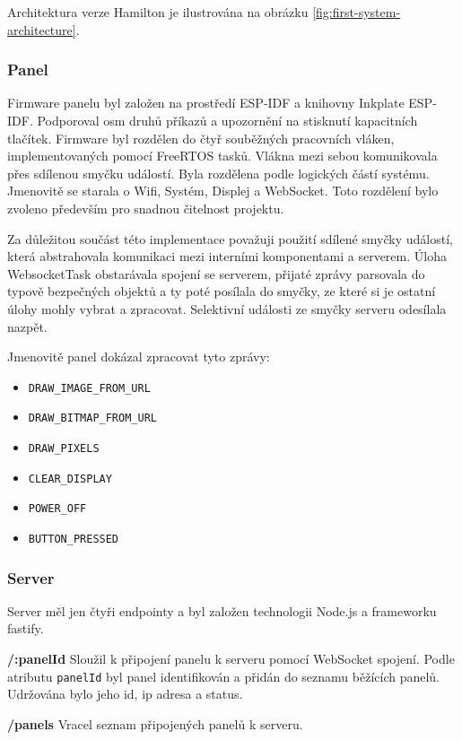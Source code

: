 Architektura verze Hamilton je ilustrována na obrázku \ref{fig:first-system-architecture}.

\subsubsection{Panel}
Firmware panelu byl založen na prostředí ESP-IDF a knihovny Inkplate ESP-IDF. Podporoval osm druhů příkazů a upozornění na stisknutí kapacitních tlačítek. Firmware byl rozdělen do čtyř souběžných pracovních vláken, implementovaných pomocí FreeRTOS tasků. Vlákna mezi sebou komunikovala přes sdílenou smyčku událostí. Byla rozdělena podle logických částí systému. Jmenovitě se starala o Wifi, Systém, Displej a WebSocket. Toto rozdělení bylo zvoleno především pro snadnou čitelnost projektu.

Za důležitou součást této implementace považuji použití sdílené smyčky událostí, která abstrahovala komunikaci mezi interními komponentami a serverem. Úloha WebsocketTask obstarávala spojení se serverem, přijaté zprávy parsovala do typově bezpečných objektů a ty poté posílala do smyčky, ze které si je ostatní úlohy mohly vybrat a zpracovat. Selektivní události ze smyčky serveru odesílala nazpět.

Jmenovitě panel dokázal zpracovat tyto zprávy:

\begin{itemize}
    \item \verb|DRAW_IMAGE_FROM_URL|
    \item \verb|DRAW_BITMAP_FROM_URL|
    \item \verb|DRAW_PIXELS|
    \item \verb|CLEAR_DISPLAY|
    \item \verb|POWER_OFF|
    \item \verb|BUTTON_PRESSED|
\end{itemize}

\subsubsection{Server}
Server měl jen čtyři endpointy a byl založen technologii Node.js a frameworku fastify.

\textbf{/:panelId} Sloužil k připojení panelu k serveru pomocí WebSocket spojení. Podle atributu \lstinline{panelId} byl panel identifikován a přidán do seznamu běžících panelů. Udržována bylo jeho id, ip adresa a status.

\textbf{/panels} Vracel seznam připojených panelů k serveru.

